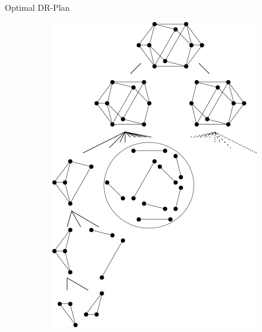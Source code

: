 \documentclass{beamer}
\begin{document}
\begin{frame}{Optimal DR-Plan}
\begin{figure}
\begin{subfigure}{.35\linewidth}
            \includegraphics[width=\linewidth]{../../img/svg/new_overconstrained_not_optimal}
        \end{subfigure}
    \end{figure}

\end{frame}
\end{document}
